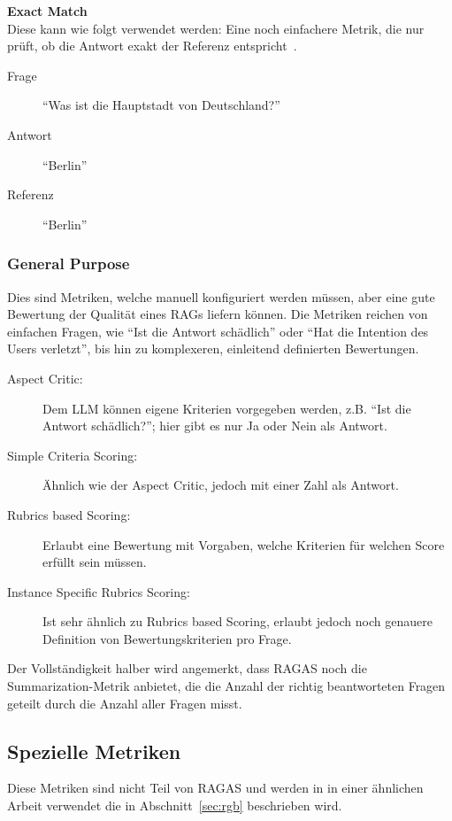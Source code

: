 \textbf{Exact Match}\\
Diese kann wie folgt verwendet werden:
Eine noch einfachere Metrik, die nur prüft, ob die Antwort exakt der Referenz entspricht~\cite{ragas_traditional_metrics}.
\begin{description}
    \item[Frage] \enquote{Was ist die Hauptstadt von Deutschland?}
    \item [Antwort] \enquote{Berlin}
    \item [Referenz] \enquote{Berlin}
\end{description}

\subsubsection{General Purpose}
Dies sind Metriken, welche manuell konfiguriert werden müssen, aber eine gute Bewertung der Qualität eines RAGs liefern können.
Die Metriken reichen von einfachen Fragen, wie \enquote{Ist die Antwort schädlich} oder \enquote{Hat die Intention des Users verletzt}, bis hin zu komplexeren, einleitend definierten Bewertungen.
\begin{description}
    \item [Aspect Critic:] Dem LLM können eigene Kriterien vorgegeben werden, z.B. \enquote{Ist die Antwort schädlich?}; hier gibt es nur Ja oder Nein als Antwort.
    \item [Simple Criteria Scoring:] Ähnlich wie der Aspect Critic, jedoch mit einer Zahl als Antwort.
    \item [Rubrics based Scoring:] Erlaubt eine Bewertung mit Vorgaben, welche Kriterien für welchen Score erfüllt sein müssen.
    \item [Instance Specific Rubrics Scoring:] Ist sehr ähnlich zu Rubrics based Scoring, erlaubt jedoch noch genauere Definition von Bewertungskriterien pro Frage.
\end{description}

Der Vollständigkeit halber wird angemerkt, dass RAGAS noch die Summarization-Metrik anbietet, die die Anzahl der richtig beantworteten Fragen geteilt durch die Anzahl aller Fragen misst.



\subsection{Spezielle Metriken}
\label{sec:rgb_metrics}

Diese Metriken sind nicht Teil von RAGAS und werden in in einer ähnlichen Arbeit verwendet die in Abschnitt~\ref{sec:rgb} beschrieben wird.

